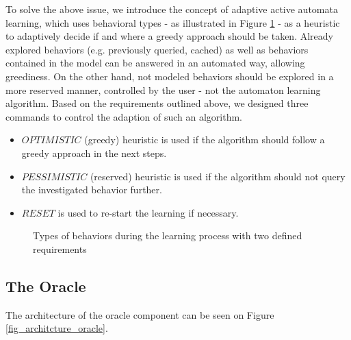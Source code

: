 To solve the above issue, we introduce the concept of adaptive active automata learning, which uses behavioral types - as illustrated in Figure \ref{fig_architcture_commandhandling} - as a heuristic to adaptively decide if and where a greedy approach should be taken. Already explored behaviors (e.g. previously queried, cached) as well as behaviors contained in the model can be answered in an automated way, allowing greediness. On the other hand, not modeled behaviors should be explored in a more reserved manner, controlled by the user - not the automaton learning algorithm. Based on the requirements outlined above, we designed three commands to control the adaption of such an algorithm.

\begin{itemize}
	\item $OPTIMISTIC$ (greedy) heuristic is used if the algorithm should follow a greedy approach in the next steps.
	\item $PESSIMISTIC$ (reserved) heuristic is used if the algorithm should not query the investigated behavior further.
	\item $RESET$ is used to re-start the learning if necessary.
\end{itemize}

\begin{figure}[!ht] 
	\centering
	\caption{Types of behaviors during the learning process with two defined requirements} 
	\label{fig_architcture_commandhandling}
\end{figure} 



\subsection{The Oracle} \label{subs_oracle}

The architecture of the oracle component can be seen on Figure \ref{fig_architcture_oracle}.

